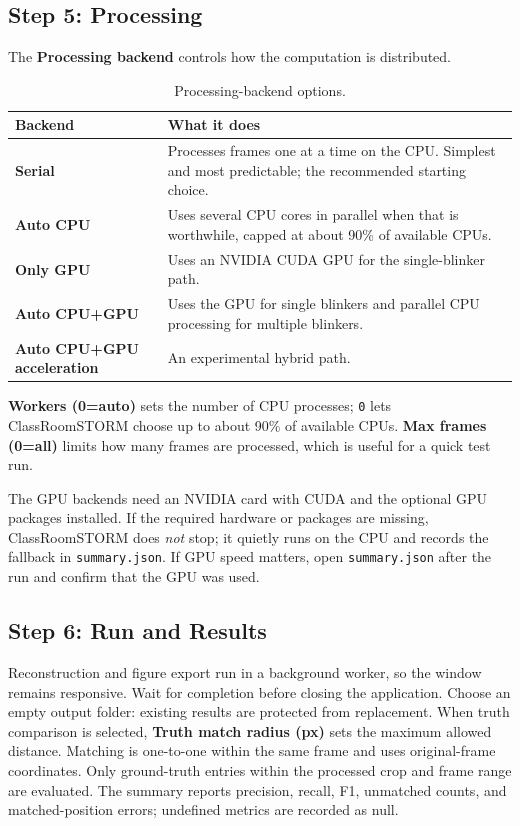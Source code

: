 \documentclass[11pt,a4paper]{article}
\newcommand{\ui}[1]{\textbf{#1}}
\newcommand{\file}[1]{\texttt{#1}}
\newcommand{\app}{ClassRoomSTORM}
\begin{document}
\subsection{Step 5: Processing}
\label{sec:rc-processing}

The \ui{Processing backend} controls how the computation is distributed.

\begin{table}[htbp]
\centering\small
\begin{tabularx}{\linewidth}{@{}lX@{}}
\toprule
\textbf{Backend} & \textbf{What it does}\\
\midrule
\ui{Serial} & Processes frames one at a time on the CPU. Simplest and most
  predictable; the recommended starting choice.\\
\ui{Auto CPU} & Uses several CPU cores in parallel when that is worthwhile,
  capped at about 90\% of available CPUs.\\
\ui{Only GPU} & Uses an NVIDIA CUDA GPU for the single-blinker path.\\
\ui{Auto CPU+GPU} & Uses the GPU for single blinkers and parallel CPU processing for multiple blinkers.\\
\ui{Auto CPU+GPU acceleration} & An experimental hybrid path.\\
\bottomrule
\end{tabularx}
\caption{Processing-backend options.}
\label{tab:backends}
\end{table}

\ui{Workers (0=auto)} sets the number of CPU processes; \texttt{0} lets \app{}
choose up to about 90\% of available CPUs. \ui{Max frames (0=all)} limits how
many frames are processed, which is useful for a quick test run.

\begin{cswarn}
The GPU backends need an NVIDIA card with CUDA and the optional GPU packages
installed. If the required hardware or packages are missing, \app{} does \emph{not} stop; it quietly runs
on the CPU and records the fallback in \file{summary.json}. If GPU speed
matters, open \file{summary.json} after the run and confirm that the GPU was used.
\end{cswarn}

\subsection{Step 6: Run and Results}
\label{sec:rc-results}

Reconstruction and figure export run in a background worker, so the window
remains responsive. Wait for completion before closing the application.
Choose an empty output folder: existing results are protected from replacement.
When truth comparison is selected, \ui{Truth match radius (px)} sets the maximum
allowed distance. Matching is one-to-one within the same frame and uses
original-frame coordinates. Only ground-truth entries within the processed crop and frame range are evaluated. The summary reports precision, recall, F1, unmatched counts,
and matched-position errors; undefined metrics are recorded as null.
\end{document}
